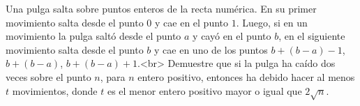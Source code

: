 Una pulga salta sobre puntos enteros de la recta numérica. En su primer movimiento salta desde el punto $0$ y cae en el punto $1$. Luego, si en un movimiento la pulga saltó desde el punto $a$ y cayó en el punto $b$, en el siguiente movimiento salta desde el punto $b$ y cae en uno de los puntos $b+(b-a)-1$, $b+(b-a)$, $b+(b-a)+1$.<br>
Demuestre que si la pulga ha caído dos veces sobre el punto $n$, para $n$ entero positivo, entonces ha debido hacer al menos $t$ movimientos, donde $t$ es el menor entero positivo mayor o igual que $2\sqrt{n}$.
